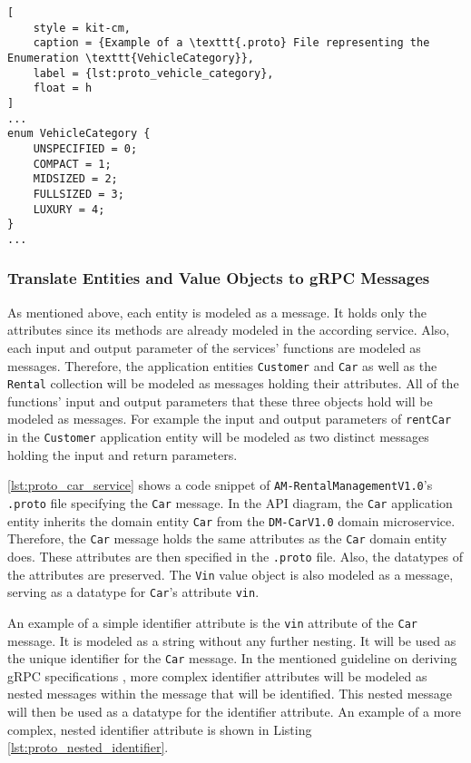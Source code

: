 \begin{lstlisting}[
    style = kit-cm,
    caption = {Example of a \texttt{.proto} File representing the Enumeration \texttt{VehicleCategory}},
    label = {lst:proto_vehicle_category},
    float = h
]
...
enum VehicleCategory {
    UNSPECIFIED = 0;
    COMPACT = 1;
    MIDSIZED = 2;
    FULLSIZED = 3;
    LUXURY = 4;
}
...
\end{lstlisting}
\subsubsection*{Translate Entities and Value Objects to gRPC Messages}
As mentioned above, each entity is modeled as a message.
It holds only the attributes since its methods are already modeled in the according service.
Also, each input and output parameter of the services' functions are modeled as messages.
Therefore, the application entities \texttt{Customer} and \texttt{Car} as well as the \texttt{Rental} collection will be modeled as messages holding their attributes.
All of the functions' input and output parameters that these three objects hold will be modeled as messages.
For example the input and output parameters of \texttt{rentCar} in the \texttt{Customer} application entity will be modeled as two distinct messages holding the input and return parameters.

\autoref{lst:proto_car_service} shows a code snippet of \texttt{AM-RentalManagementV1.0}'s \texttt{.proto} file specifying the \texttt{Car} message.
In the API diagram, the \texttt{Car} application entity inherits the domain entity \texttt{Car} from the \texttt{DM-CarV1.0} domain microservice.
Therefore, the \texttt{Car} message holds the same attributes as the \texttt{Car} domain entity does.
These attributes are then specified in the \texttt{.proto} file.
Also, the datatypes of the attributes are preserved.
The \texttt{Vin} value object is also modeled as a message, serving as a datatype for \texttt{Car}'s attribute \texttt{vin}.

An example of a simple identifier attribute is the \texttt{vin} attribute of the \texttt{Car} message.
It is modeled as a string without any further nesting.
It will be used as the unique identifier for the \texttt{Car} message.
In the mentioned guideline on deriving gRPC specifications \cite{CM-G-RPC}, more complex identifier attributes will be modeled as nested messages within the message that will be identified.
This nested message will then be used as a datatype for the identifier attribute.
An example of a more complex, nested identifier attribute is shown in Listing \autoref{lst:proto_nested_identifier}.

